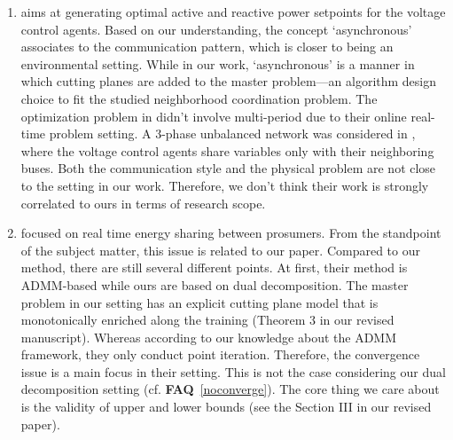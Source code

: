 \documentclass[11pt]{article}
\newcommand{\faq}[1]{\textbf{FAQ}~\ref{#1}}
\begin{document}
\begin{enumerate}
\begin{enumerate}
        You see, in their model, the number of copy constraints and dual variables grow linearly
        with the number of VPPs, which goes up in large-scale settings.
        This wouldn't happen if a Benders' framework were adopted.
        According to their two case studies---IEEE 33- and 123-bus systems,
        their distributed algorithm took $>1.25$ times longer (from TABLE II) than the centralized algorithm.
        In our work, the centralized algorithm is slower for large cases.
        They mentioned `mixed integer programming' in their CONCLUSION part---what
        we are doing now.
        So, yes, this is a relevant citation.
            \item  \cite{patari2023}  aims at generating
        optimal active and reactive power setpoints for the voltage control agents.
        Based on our understanding, the concept `asynchronous' associates to the communication pattern,
        which is closer to being an environmental setting.
        While in our work, `asynchronous' is a manner in which cutting planes are added to the master problem---an algorithm design choice to fit the studied neighborhood coordination problem.
        The optimization problem in \cite{patari2023} didn't involve multi-period due to their online real-time
        problem setting.
        A 3-phase unbalanced network was considered in \cite{patari2023}, where the voltage control agents share
        variables only with their neighboring buses.
        Both the communication style and the physical problem are not close to the setting in our work.
        Therefore, we don't think their work is strongly correlated to ours in terms of research scope.
            \item \cite{wu2025} focused on real time energy sharing between prosumers.
        From the standpoint of the subject matter, this issue is related to our paper.
        Compared to our method, there are still several different points.
        At first, their method is ADMM-based while ours are based on dual decomposition. 
        The master problem in our setting has an explicit cutting plane model that is monotonically enriched along the training (Theorem 3 in our revised manuscript).
        Whereas according to our knowledge about the ADMM framework, they only conduct point iteration.
        Therefore, the convergence issue is a main focus in their setting.
        This is not the case considering our dual decomposition setting (cf. \faq{noconverge}).
        The core thing we care about is the validity of upper and lower bounds (see the Section III in our revised paper).

\end{enumerate}
\end{enumerate}
\end{document}
